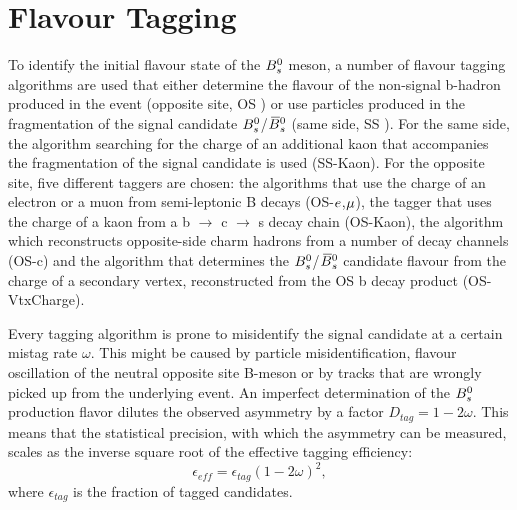 \clearpage
\section{Flavour Tagging}
\label{sec:Tagging}

To identify the initial flavour state of the ${{B}^0_{s}}$ meson,
a number of flavour tagging algorithms are used that either determine the flavour of the non-signal b-hadron produced in the event (opposite site, OS \cite{LHCb-PAPER-2011-027})
or use particles produced in the fragmentation of the signal candidate ${{B}^0_{s}}$/${{\kern 0.18em\overline{\kern -0.18em B}{}}{}^0_{s}}$ (same side, SS \cite{Aaij:2016psi}). 
For the same side, the algorithm searching for the charge of an additional kaon that accompanies the fragmentation of the signal candidate is used (SS-Kaon). 
For the opposite site, five different taggers are chosen: 
the algorithms that use the charge of an electron or a muon from semi-leptonic B decays (OS-${e}$,${\mu}$), 
the tagger that uses the charge of a kaon from a b $\to$ c $\to$ s decay chain (OS-Kaon),
the algorithm which reconstructs opposite-side charm hadrons from a number of decay channels (OS-c)
and the algorithm that determines the ${{B}^0_{s}}$/${{\kern 0.18em\overline{\kern -0.18em B}{}}{}^0_{s}}$ candidate flavour from the charge of a secondary vertex, reconstructed from the OS b decay product (OS-VtxCharge). 

Every tagging algorithm is prone to misidentify the signal candidate at a certain mistag rate $\omega$. %
This might be caused by particle misidentification, flavour oscillation of the neutral opposite site B-meson or by tracks that are wrongly picked up from the underlying event. 
An imperfect determination of the ${{B}^0_{s}}$ production 
flavor dilutes the observed \CP asymmetry by a factor $D_{tag} = 1 - 2\omega$.
This means that the statistical precision, with which the \CP asymmetry can be measured, scales as the inverse square root of the effective tagging efficiency:
\begin{equation}
\label{eq: taggingEfficiency}
\epsilon_{eff} = \epsilon_{tag}(1 - 2\omega)^{2},
\end{equation}
where $\epsilon_{tag}$ is the fraction of tagged candidates. 

